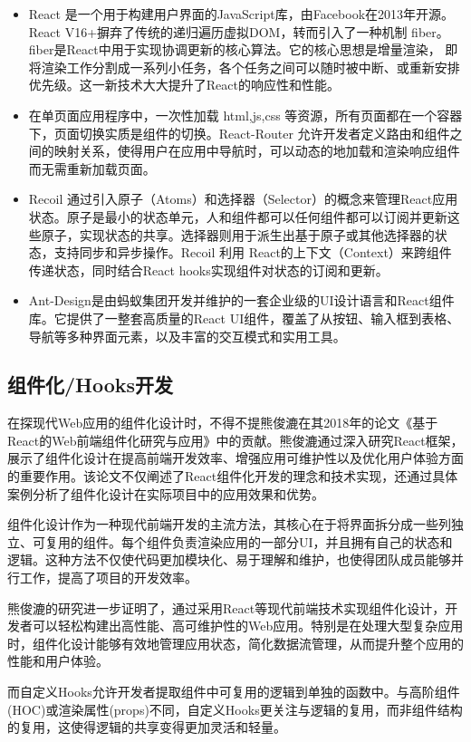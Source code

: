 \documentclass[12pt,a4paper]{article}
\begin{document}
\begin{CJK*}{UTF8}{gbsn}
\begin{itemize}
    \item React 是一个用于构建用户界面的JavaScript库，由Facebook在2013年开源。React V16+摒弃了传统的递归遍历虚拟DOM，转而引入了一种机制 fiber。fiber是React中用于实现协调更新的核心算法。它的核心思想是增量渲染， 即将渲染工作分割成一系列小任务，各个任务之间可以随时被中断、或重新安排优先级。这一新技术大大提升了React的响应性和性能。
    \item 在单页面应用程序中，一次性加载 html,js,css 等资源，所有页面都在一个容器下，页面切换实质是组件的切换。React-Router 允许开发者定义路由和组件之间的映射关系，使得用户在应用中导航时，可以动态的地加载和渲染响应组件而无需重新加载页面。
    \item Recoil 通过引入原子（Atoms）和选择器（Selector）的概念来管理React应用状态。原子是最小的状态单元，人和组件都可以任何组件都可以订阅并更新这些原子，实现状态的共享。选择器则用于派生出基于原子或其他选择器的状态，支持同步和异步操作。Recoil 利用 React的上下文（Context）来跨组件传递状态，同时结合React hooks实现组件对状态的订阅和更新。
    \item Ant-Design是由蚂蚁集团开发并维护的一套企业级的UI设计语言和React组件库。它提供了一整套高质量的React UI组件，覆盖了从按钮、输入框到表格、导航等多种界面元素，以及丰富的交互模式和实用工具。
\end{itemize}
\subsection{组件化/Hooks开发}
在探现代Web应用的组件化设计时，不得不提熊俊漉在其2018年的论文《基于React的Web前端组件化研究与应用》\cite{xiongjunlucomponentization}中的贡献。熊俊漉通过深入研究React框架，展示了组件化设计在提高前端开发效率、增强应用可维护性以及优化用户体验方面的重要作用。该论文不仅阐述了React组件化开发的理念和技术实现，还通过具体案例分析了组件化设计在实际项目中的应用效果和优势。

组件化设计作为一种现代前端开发的主流方法，其核心在于将界面拆分成一些列独立、可复用的组件。每个组件负责渲染应用的一部分UI，并且拥有自己的状态和逻辑。这种方法不仅使代码更加模块化、易于理解和维护，也使得团队成员能够并行工作，提高了项目的开发效率。

熊俊漉的研究进一步证明了，通过采用React等现代前端技术实现组件化设计，开发者可以轻松构建出高性能、高可维护性的Web应用。特别是在处理大型复杂应用时，组件化设计能够有效地管理应用状态，简化数据流管理，从而提升整个应用的性能和用户体验。

而自定义Hooks允许开发者提取组件中可复用的逻辑到单独的函数中。与高阶组件(HOC)或渲染属性(props)不同，自定义Hooks更关注与逻辑的复用，而非组件结构的复用，这使得逻辑的共享变得更加灵活和轻量。


\end{CJK*}
\end{document}
